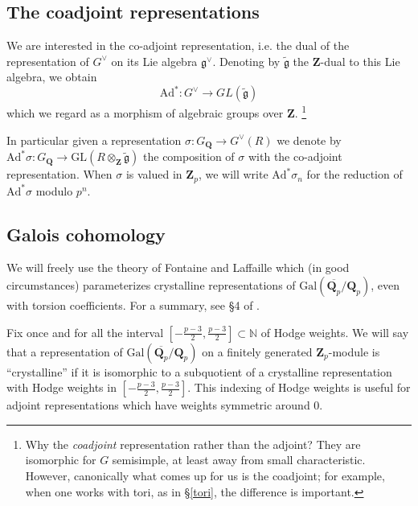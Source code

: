 \documentclass[10pt]{amsart}
\newcommand{\Z}{\mathbf{Z}}
\newcommand{\Gal}{\mathrm{Gal}}
\newcommand{\dualLiedual}{\widetilde{\mathfrak{g}}}
\newcommand{\Ad}{\mathrm{Ad}}
\newcommand{\Q}{\mathbf{Q}}
\newcommand{\GL}{\mathrm{GL}}
\theoremstyle{remark}
\begin{document}
 
 \subsection{The coadjoint representations}

We are interested in the co-adjoint representation, i.e. the dual of the 
representation of $G^{\vee}$ on its Lie algebra $\mathfrak{g}^{\vee}$.  
Denoting by $\dualLiedual$ the $\Z$-dual to this Lie algebra, we obtain  \index{$\Ad^*$} 
$$\Ad^*: G^{\vee} \rightarrow GL(\dualLiedual)$$ 
which we regard as a morphism of algebraic groups over $\Z$. 
\footnote{Why the {\em coadjoint} representation rather than the adjoint? They are isomorphic
for $G$ semisimple, at least away from small characteristic. However, canonically what comes up for us is the coadjoint;
for example,  when one works with tori, as in \S \ref{tori}, the difference is important. }
 

In particular given a representation $\sigma: G_{\Q} \rightarrow G^{\vee}(R)$ we denote by   
$\Ad^* \sigma: G_{\Q} \rightarrow \GL(R \otimes_{\Z} \dualLiedual)$ 
the composition of $\sigma$ with the co-adjoint representation.  
When $\sigma$ is valued in $\Z_p$, we will write
$\Ad ^* \sigma_n$ for the reduction of $\Ad ^* \sigma$ modulo $p^n$.  


\subsection{Galois cohomology} 

We will freely use the theory of Fontaine and Laffaille which (in good circumstances) parameterizes
crystalline representations of $\Gal(\overline{\Q_p}/\Q_p)$, even with torsion coefficients. For a summary, see \S 4 of \cite{BK}. 

Fix once and for all the interval $[-\frac{p-3}{2}, \frac{p-3}{2}] \subset \mathbb{N}$ of Hodge weights. 
We will say that a  representation   of $\Gal(\overline{\Q_p}/\Q_p)$  on a finitely generated $\Z_p$-module is  ``crystalline''
if it is isomorphic to a subquotient of a crystalline representation with Hodge weights in $[-\frac{p-3}{2}, \frac{p-3}{2}]$. 
This indexing of Hodge weights is useful for  adjoint representations  which have weights symmetric around $0$.
\end{document}
